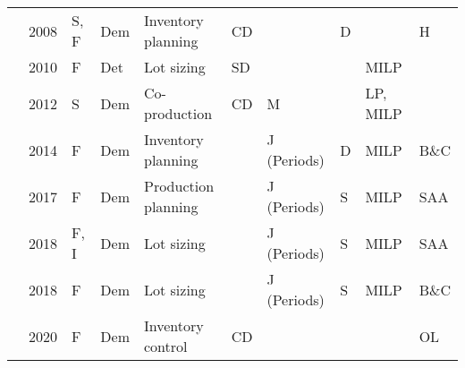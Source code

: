 \begin{table}[ht]
\begin{adjustbox}{width=1\textwidth,center=\textwidth}
\begin{tabular}{llllllllll}
\citeauthor{nagarajan2008inventory} & 2008                                    & S, F                                 & Dem                               & Inventory planning              &CD                  &                              & D              &                         &  H             \\
\citeauthor{lang2010efficient}         & 2010                                    & F                                       & Det                               & Lot sizing                      & SD                  &                              &                & MILP                        &              \\
\citeauthor{ng2012robust}              & 2012                                    & S                                       & Dem                               & Co-production                   &CD                  & \multicolumn{2}{l}{M}  &                    LP, MILP       &              \\
\citeauthor{zhang2014branch}             & 2014                                    & F                                       & Dem                               & Inventory planning                      &                     & J (Periods)                   & D              &              MILP        & B\&C               \\
\citeauthor{jiang2017production}              & 2017                                    & F                                       & Dem                               & \multicolumn{2}{l}{Production planning}               & J (Periods)                   & S              &      MILP                  &  SAA            \\
\citeauthor{gicquel2018joint}         & 2018                                    & F, I                                  & Dem                               & Lot sizing                      &                     & J (Periods)                   & S              &  MILP                 &   SAA           \\
\citeauthor{liu2018polyhedral}          & 2018                                    & F                                       & Dem                               & Lot sizing                      &                     & J (Periods)                   & S              &                 MILP   & B\&C                \\
\citeauthor{chen2020dynamic}             & 2020                                    &    F                                     & Dem                               & Inventory control               &CD                  &                              &                & &  OL \\

\end{tabular}
\end{adjustbox}
\end{table}
